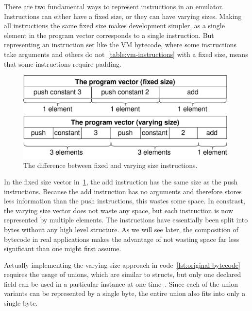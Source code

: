 There are two fundamental ways to represent instructions in an emulator.
Instructions can either have a fixed size, or they can have varying sizes.
Making all instructions the same fixed size makes development simpler, as a single element in the program vector corresponds to a single instruction.
But representing an instruction set like the VM bytecode, where some instructions take arguments and others do not~\ref{table:vm-instructions} with a fixed size, means that some instructions require padding.
\begin{center}
  \begin{figure}[ht]
    \centering
    \includegraphics[width=12cm]{fig/instruction-size.png}
    \caption{The difference between fixed and varying size instructions.}
    \label{fig:instruction-size}
  \end{figure}
\end{center}
In the fixed size vector in~\cref{fig:instruction-size}, the add instruction has the same size as the push instructions.
Because the add instruction has no arguments and therefore stores less information than the push instructions, this wastes some space.
In constrast, the varying size vector does not waste any space, but each instruction is now represented by multiple elements.
The instructions have essentially been split into bytes without any high level structure.
As we will see later, the composition of bytecode in real applications makes the advantage of not wasting space far less significant than one might first assume.

Actually implementing the varying size approach in code~\ref{lst:original-bytecode} requires the usage of unions, which are similar to structs, but only one declared field can be used in a particular instance at one time~\cite{klabnik2019rust}.
Since each of the union variants can be represented by a single byte, the entire union also fits into only a single byte.


